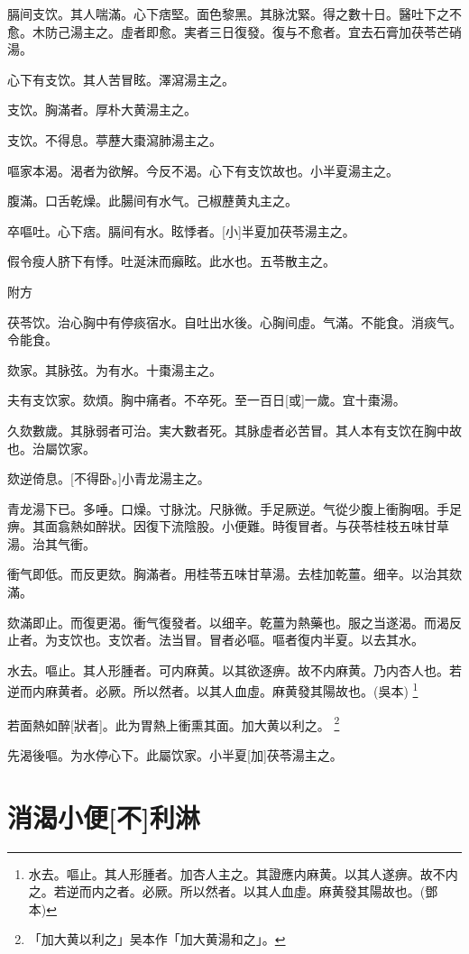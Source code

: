 \documentclass[oneside,b4paper]{ctexbook}
\begin{document}
\begin{flushleft}
膈间支饮。其人喘滿。心下痞堅。面色黎黑。其脉沈緊。得之數十日。醫吐下之不愈。木防己湯主之。虛者即愈。実者三日復發。復与不愈者。宜去石膏加茯苓芒硝湯。

心下有支饮。其人苦冒眩。澤瀉湯主之。

支饮。胸滿者。厚朴大黄湯主之。

支饮。不得息。葶藶大棗瀉肺湯主之。

嘔家本渴。渴者为欲解。今反不渴。心下有支饮故也。小半夏湯主之。

腹滿。口舌乾燥。此腸间有水气。己椒藶黄丸主之。

卒嘔吐。心下痞。膈间有水。眩悸者。[小]半夏加茯苓湯主之。

假令瘦人脐下有悸。吐涎沫而癲眩。此水也。五苓散主之。

附方

茯苓饮。治心胸中有停痰宿水。自吐出水後。心胸间虛。气滿。不能食。消痰气。令能食。

欬家。其脉弦。为有水。十棗湯主之。

夫有支饮家。欬煩。胸中痛者。不卒死。至一百日[或]一歲。宜十棗湯。

久欬數歲。其脉弱者可治。実大數者死。其脉虛者必苦冒。其人本有支饮在胸中故也。治屬饮家。

欬逆倚息。[不得卧。]小青龙湯主之。

青龙湯下已。多唾。口燥。寸脉沈。尺脉微。手足厥逆。气從少腹上衝胸咽。手足痹。其面翕熱如醉狀。因復下流陰股。小便難。時復冒者。与茯苓桂枝五味甘草湯。治其气衝。

衝气即低。而反更欬。胸滿者。用桂苓五味甘草湯。去桂加乾薑。细辛。以治其欬滿。

欬滿即止。而復更渴。衝气復發者。以细辛。乾薑为熱藥也。服之当遂渴。而渴反止者。为支饮也。支饮者。法当冒。冒者必嘔。嘔者復内半夏。以去其水。

水去。嘔止。其人形腫者。可内麻黄。以其欲逐痹。故不内麻黄。乃内杏人也。若逆而内麻黄者。必厥。所以然者。以其人血虛。麻黄發其陽故也。(吳本)
\footnote{水去。嘔止。其人形腫者。加杏人主之。其證應内麻黄。以其人遂痹。故不内之。若逆而内之者。必厥。所以然者。以其人血虛。麻黄發其陽故也。(鄧本)}

若面熱如醉[狀者]。此为胃熱上衝熏其面。加大黄以利之。
\footnote{「加大黄以利之」吴本作「加大黄湯和之」。}

先渴後嘔。为水停心下。此屬饮家。小半夏[加]茯苓湯主之。

\chapter{消渴小便[不]利淋}


\end{flushleft}
\end{document}
